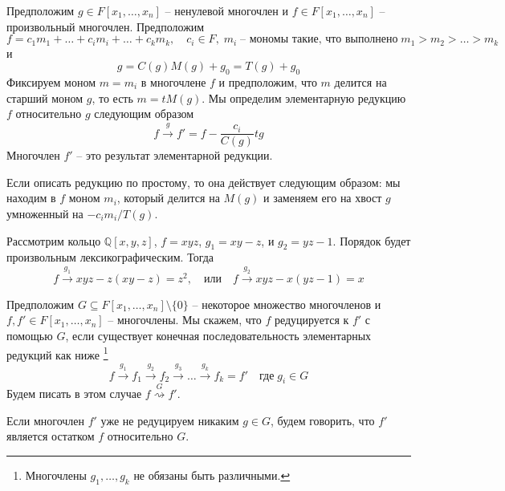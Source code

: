 \begin{definition}
Предположим $g\in F[x_1,\ldots,x_n]$ -- ненулевой многочлен и $f\in F[x_1,\ldots,x_n]$ -- произвольный многочлен.
Предположим
\[
f= c_1m_1 + \ldots + c_i m_i + \ldots + c_k m_k,\quad c_i\in F,\;m_i\;\text{-- мономы такие, что выполнено}\; m_1 > m_2 >\ldots>m_k
\]
и
\[
g = C(g) M(g) + g_0 = T(g) + g_0
\]
Фиксируем моном $m = m_i$ в многочлене $f$ и предположим, что $m$ делится на старший моном $g$, то есть $m = t M(g)$.
Мы определим элементарную редукцию $f$ относительно $g$ следующим образом
\[
f\stackrel{g}{\longrightarrow} f' = f - \frac{c_i}{C(g)}t g
\]
Многочлен $f'$ -- это результат элементарной редукции.
\end{definition}

Если описать редукцию по простому, то она действует следующим образом: мы находим в $f$ моном $m_i$, который делится на $M(g)$ и заменяем его на хвост $g$ умноженный на $- c_i m_i / T(g)$.

\begin{example}
Рассмотрим кольцо $\mathbb Q[x, y, z]$, $f = xyz$, $g_1 = xy - z$, и $g_2 = yz - 1$.
Порядок будет произвольным лексикографическим.
Тогда
\[
f\stackrel{g_1}{\longrightarrow} xyz - z(xy - z) = z^2,
\quad\text{или}\quad
f\stackrel{g_2}{\longrightarrow} xyz - x(yz - 1) = x
\]
\end{example}

\begin{definition}
Предположим $G\subseteq F[x_1,\ldots,x_n]\setminus \{0\}$ -- некоторое множество многочленов и $f, f'\in F[x_1,\ldots,x_n]$ -- многочлены.
Мы скажем, что $f$ редуцируется к $f'$ с помощью $G$, если существует конечная последовательность элементарных редукций как ниже%
\footnote{Многочлены $g_1,\ldots,g_k$ не обязаны быть различными.}
\[
f\stackrel{g_1}{\longrightarrow}f_1\stackrel{g_2}{\longrightarrow}f_2\stackrel{g_3}{\longrightarrow}\ldots \stackrel{g_k}{\longrightarrow}f_k = f'\quad\text{где}\;g_i \in G
\]
Будем писать в этом случае $f\stackrel{G}{\rightsquigarrow} f'$.

Если многочлен $f'$ уже не редуцируем никаким $g\in G$, будем говорить, что $f'$ является остатком $f$ относительно $G$.
\end{definition}


